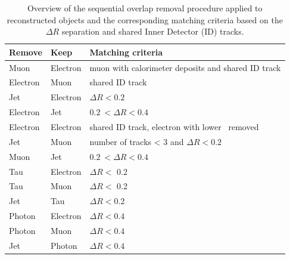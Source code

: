 \begin{table}[ht]
  \caption{Overview of the sequential overlap removal procedure applied to reconstructed objects and the corresponding matching criteria based on the $\Delta R$ separation and shared Inner Detector (ID) tracks.}%
  \label{tab:or}
  \centering 
  \begin{tabular}{lll}
    \toprule\midrule
    Remove & Keep & Matching criteria \\
    \midrule
    Muon     	& Electron & muon with calorimeter deposits and shared ID track \\
    Electron 	& Muon     & shared ID track \\
    Jet      		& Electron & \(\Delta R < 0.2\) \\
    Electron 	& Jet      & \(0.2\ < \Delta R < 0.4\) \\
    Electron	& Electron & shared ID track,  electron with lower \pT\ removed\\
    Jet      		& Muon     & number of tracks < 3 and \(\Delta R < 0.2\) \\
    Muon 	    & Jet      & \(0.2\ < \Delta R < 0.4\) \\
    Tau      	 	& Electron & \(\Delta R <\) 0.2 \\
    Tau       	 	& Muon     & \(\Delta R <\) 0.2 \\
    Jet      		& Tau      & \(\Delta R < 0.2\) \\
    Photon   	& Electron & \(\Delta R < 0.4\) \\
    Photon   	& Muon     & \(\Delta R < 0.4\) \\
    Jet   	& Photon      & \(\Delta R < 0.4\) \\
  \midrule
    \bottomrule
  \end{tabular}
\end{table}